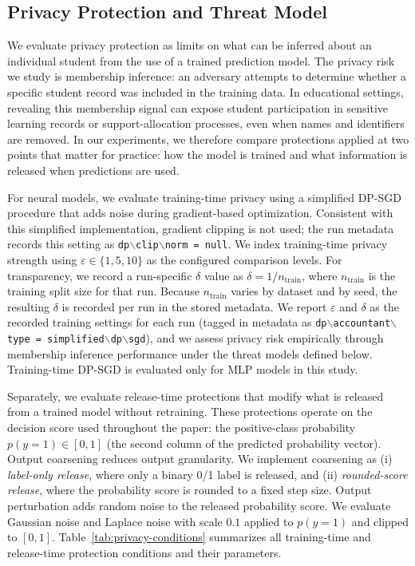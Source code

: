 \documentclass{edm_article}
\begin{document}
\subsection{Privacy Protection and Threat Model}

We evaluate privacy protection as limits on what can be inferred about an individual student from the use of a trained prediction model. The privacy risk we study is membership inference: an adversary attempts to determine whether a specific student record was included in the training data. In educational settings, revealing this membership signal can expose student participation in sensitive learning records or support-allocation processes, even when names and identifiers are removed. In our experiments, we therefore compare protections applied at two points that matter for practice: how the model is trained and what information is released when predictions are used.

For neural models, we evaluate training-time privacy using a simplified DP-SGD procedure that adds noise during gradient-based optimization. Consistent with this simplified implementation, gradient clipping is not used; the run metadata records this setting as \texttt{dp$\backslash$clip$\backslash$norm = null}. We index training-time privacy strength using $\varepsilon \in \{1,5,10\}$ as the configured comparison levels. For transparency, we record a run-specific $\delta$ value as $\delta = 1/n_{\text{train}}$, where $n_{\text{train}}$ is the training split size for that run. Because $n_{\text{train}}$ varies by dataset and by seed, the resulting $\delta$ is recorded per run in the stored metadata. We report $\varepsilon$ and $\delta$ as the recorded training settings for each run (tagged in metadata as \texttt{dp$\backslash$accountant$\backslash$type = simplified$\backslash$dp$\backslash$sgd}), and we assess privacy risk empirically through membership inference performance under the threat models defined below. Training-time DP-SGD is evaluated only for MLP models in this study.


Separately, we evaluate release-time protections that modify what is released from a trained model without retraining. These protections operate on the decision score used throughout the paper: the positive-class probability $p(y{=}1)\in[0,1]$ (the second column of the predicted probability vector). Output coarsening reduces output granularity. We implement coarsening as (i) \emph{label-only release}, where only a binary 0/1 label is released, and (ii) \emph{rounded-score release}, where the probability score is rounded to a fixed step size. Output perturbation adds random noise to the released probability score. We evaluate Gaussian noise and Laplace noise with scale $0.1$ applied to $p(y{=}1)$ and clipped to $[0,1]$. Table~\ref{tab:privacy-conditions} summarizes all training-time and release-time protection conditions and their parameters.
\end{document}
